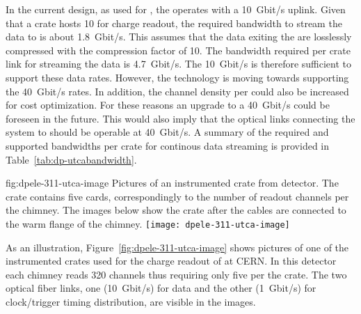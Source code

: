 In the current design, as used for , the  operates with a \SI{10}{Gbit/s} uplink. Given that a  crate hosts \num{10}  for charge readout, the required bandwidth to stream the data to  is about \SI{1.8}{Gbit/s}. This assumes that the data exiting the  are losslessly compressed with the compression factor of \num{10}. The bandwidth required per crate link for streaming the  data is \SI{4.7}{Gbit/s}. The \SI{10}{Gbit/s}  is therefore sufficient to support these data rates. However, the technology is moving towards supporting the \SI{40}{Gbit/s} rates. In addition, the channel density per  could also be increased for cost optimization. For these reasons an upgrade to a \SI{40}{Gbit/s}  could be foreseen in the future. This would also imply that the optical links connecting the  system to   should be operable at \SI{40}{Gbit/s}. A summary of the required and supported bandwidths per  crate for continous data streaming is provided in Table~\ref{tab:dp-utcabandwidth}.

\begin{dunefigure}{fig:dpele-311-utca-image}
{Pictures of an instrumented  crate from  detector. The crate contains five  cards, correspondingly to the number of readout channels per the  chimney. The images below show the crate after the  cables are connected to the warm flange of the  chimney.}
\texttt{[image: dpele-311-utca-image]}
\end{dunefigure}

As an illustration, Figure~\ref{fig:dpele-311-utca-image} shows pictures of one of the instrumented  crates used for the charge readout of  at CERN. In this detector each  chimney reads \num{320} channels thus requiring only five  per the  crate. The two optical fiber links, one (\SI{10}{Gbit/s}) for data and the other (\SI{1}{Gbit/s}) for clock/trigger timing distribution, are visible in the images.       

